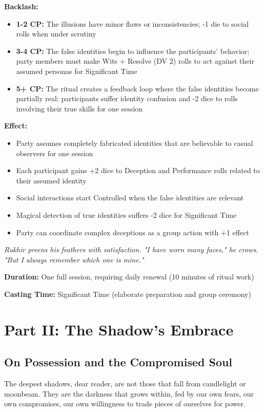 \documentclass[12pt,twoside]{book}
\newcommand{\shadow}[1]{\textit{#1}}
\begin{document}
\textbf{Backlash:}
\begin{itemize}
\item \textbf{1-2 CP:} The illusions have minor flaws or inconsistencies; -1 die to social rolls when under scrutiny
\item \textbf{3-4 CP:} The false identities begin to influence the participants' behavior; party members must make Wits + Resolve (DV 2) rolls to act against their assumed personas for Significant Time
\item \textbf{5+ CP:} The ritual creates a feedback loop where the false identities become partially real; participants suffer identity confusion and -2 dice to rolls involving their true skills for one session
\end{itemize}

\textbf{Effect:}
\begin{itemize}
\item Party assumes completely fabricated identities that are believable to casual observers for one session
\item Each participant gains +2 dice to Deception and Performance rolls related to their assumed identity
\item Social interactions start Controlled when the false identities are relevant
\item Magical detection of true identities suffers -2 dice for Significant Time
\item Party can coordinate complex deceptions as a group action with +1 effect
\end{itemize}

\shadow{Rukhir preens his feathers with satisfaction. "I have worn many faces," he crows. "But I always remember which one is mine."}

\textbf{Duration:} One full session, requiring daily renewal (10 minutes of ritual work)

\textbf{Casting Time:} Significant Time (elaborate preparation and group ceremony)

\chapter{Part II: The Shadow's Embrace}

\section*{On Possession and the Compromised Soul}

\lettrine[lines=3]{T}{}he deepest shadows, dear reader, are not those that fall from candlelight or moonbeam. They are the darkness that grows within, fed by our own fears, our own compromises, our own willingness to trade pieces of ourselves for power. 
\end{document}
